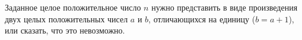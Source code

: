 Заданное целое положительное число $n$ нужно представить
в виде произведения двух целых положительных чисел $a$ и $b$,
отличающихся на единицу ($b = a + 1$), или сказать, что это невозможно.
